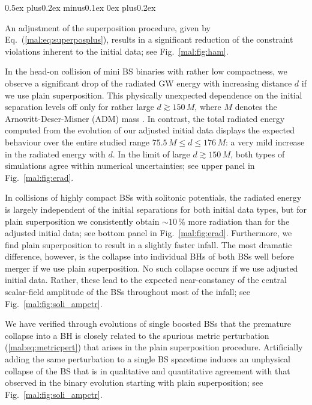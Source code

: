 \begin{list}{\rm{\bf ()}}{
                
             \parsep0.5ex plus0.2ex minus0.1ex \itemsep0ex plus0.2ex}
  \item An adjustment of the superposition procedure, given 
  by Eq.~(\ref{mal:eq:superposplus}), results in a significant
  reduction of the constraint violations inherent to the initial data;
  see Fig.~\ref{mal:fig:ham}.
  \item In the head-on collision of mini BS binaries with rather low compactness,
  we observe a significant drop of the radiated GW energy with increasing
  distance $d$ if we use plain superposition. This physically unexpected dependence
  on the initial separation levels off only for rather large 
  $d\gtrsim 150\,M$,
  where $M$ denotes the Arnowitt-Deser-Misner (ADM) mass
  \cite{Arnowitt:1962hi}. In contrast, the total radiated energy computed from
  the evolution of our adjusted initial data displays the expected
  behaviour over the entire studied range $75.5\,M\le d\le 176\,M$:
  a very mild increase in the radiated energy with $d$. In the limit of large
  $d \gtrsim 150\,M$, both types of simulations agree within numerical uncertainties;
  see upper panel in Fig.~\ref{mal:fig:erad}.
  \item In collisions of highly compact BSs with solitonic potentials,
  the radiated energy is largely independent of the initial separations
  for both initial data types, but for plain superposition we consistently
  obtain $\sim 10\,\%$ more radiation than for the adjusted initial data;
  see bottom panel in Fig.~\ref{mal:fig:erad}. Furthermore,
  we find plain superposition to result in a slightly faster infall.
  The most dramatic difference, however, is the collapse into individual BHs
  of both BSs well before merger if we use plain superposition. No such collapse
  occurs if we use adjusted initial data. Rather,
  these lead to the expected near-constancy of the central scalar-field amplitude
  of the BSs throughout most of the infall; see Fig.~\ref{mal:fig:soli_ampctr}.
  \item We have verified through evolutions of single boosted BSs that the
  premature collapse into a BH is closely related to the spurious metric
  perturbation (\ref{mal:eq:metricpert}) that arises in the plain superposition
  procedure. Artificially adding the same perturbation to a single BS
  spacetime induces an unphysical collapse of the BS that is in
  qualitative and quantitative agreement with that observed in
  the binary evolution starting with plain superposition;
  see Fig.~\ref{mal:fig:soli_ampctr}.
\end{list}
%

